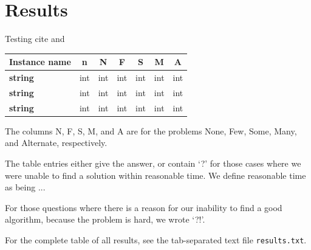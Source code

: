 \chapter{Results}

Testing cite \cite{AI-BOOK} and \space{}

\begin{table}[H]
\centering
    \begin{tabular}{|l|r|r|r|r|r|r|}
    \hline
    \rowcolor[HTML]{EFEFEF} 
    \textbf{Instance name} &
      \multicolumn{1}{c|}{\cellcolor[HTML]{EFEFEF}\textbf{n}} &
      \multicolumn{1}{c|}{\cellcolor[HTML]{EFEFEF}\textbf{N}} &
      \multicolumn{1}{c|}{\cellcolor[HTML]{EFEFEF}\textbf{F}} &
      \multicolumn{1}{c|}{\cellcolor[HTML]{EFEFEF}\textbf{S}} &
      \multicolumn{1}{c|}{\cellcolor[HTML]{EFEFEF}\textbf{M}} &
      \multicolumn{1}{c|}{\cellcolor[HTML]{EFEFEF}\textbf{A}} \\ \hline
    \cellcolor[HTML]{EFEFEF}\textbf{string}     & int & int & int & int & int & int \\ \hline
    \cellcolor[HTML]{EFEFEF}\textbf{string}     & int & int & int & int & int & int \\ \hline
    \cellcolor[HTML]{EFEFEF}\textbf{string}     & int & int & int & int & int & int \\ \hline
    \end{tabular}
\end{table}

The columns N, F, S, M, and A are for the problems None, Few, Some, Many, and Alternate, respectively.

The table entries either give the answer, or contain `?' for those cases where we were unable to find a solution within reasonable time. We define reasonable time as being ...

For those questions where there is a reason for our inability to find a good algorithm, because the problem is hard, we wrote `?!'.

For the complete table of all results, see the tab-separated text file {\tt results.txt}.